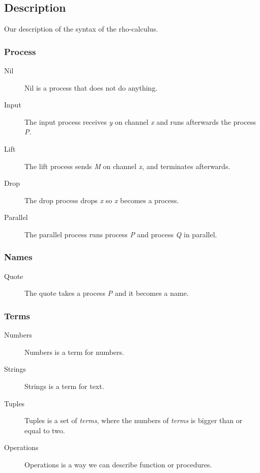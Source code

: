 \subsection{Description}
Our description of the syntax of the rho-calculus.

\subsubsection{Process}
\begin{description}
\item[Nil] Nil is a process that does not do anything.
\item[Input] The input process receives \textit{y} on channel \textit{x} and runs afterwards the process \textit{P}.
\item[Lift]The lift process sends \textit{M} on channel \textit{x}, and terminates afterwards.
\item[Drop] The drop process drops \textit{x} so \textit{x} becomes a process.
\item[Parallel] The parallel process runs process \textit{P} and process \textit{Q} in parallel.
\end{description}


\subsubsection{Names}
\begin{description}
\item[Quote] The quote takes a process \textit{P} and it becomes a name.
\end{description}


\subsubsection{Terms}
\begin{description}
\item[Numbers] Numbers is a term for numbers.
\item[Strings] Strings is a term for text.
\item[Tuples] Tuples is a set of \textit{terms}, where the numbers of \textit{terms} is bigger than or equal to two.
\item[Operations] Operations is a way we can describe function or procedures.
\end{description}


